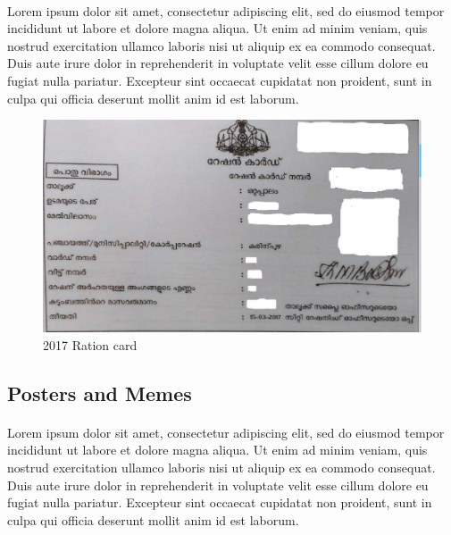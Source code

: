 \documentclass[10pt]{article}
\begin{document}
\paragraph{}

Lorem ipsum dolor sit amet, consectetur adipiscing elit, sed do eiusmod tempor incididunt ut labore et dolore magna aliqua. Ut enim ad minim veniam, quis nostrud exercitation ullamco laboris nisi ut aliquip ex ea commodo consequat. Duis aute irure dolor in reprehenderit in voluptate velit esse cillum dolore eu fugiat nulla pariatur. Excepteur sint occaecat cupidatat non proident, sunt in culpa qui officia deserunt mollit anim id est laborum.


\begin{figure}[h!]
 \centering
  \includegraphics[width=1.0\textwidth]{images/2017-rationcard.jpg}
   \caption{2017 Ration card}
\end{figure}


\subsection{Posters and Memes}

\paragraph{}
Lorem ipsum dolor sit amet, consectetur adipiscing elit, sed do eiusmod tempor incididunt ut labore et dolore magna aliqua. Ut enim ad minim veniam, quis nostrud exercitation ullamco laboris nisi ut aliquip ex ea commodo consequat. Duis aute irure dolor in reprehenderit in voluptate velit esse cillum dolore eu fugiat nulla pariatur. Excepteur sint occaecat cupidatat non proident, sunt in culpa qui officia deserunt mollit anim id est laborum.
\end{document}
